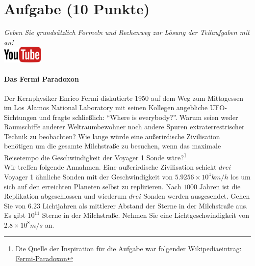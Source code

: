 \documentclass[a4paper, 9pt]{scrartcl}\usepackage[]{graphicx}\usepackage[]{xcolor}
\begin{document}
 
\clearpage

\section{Aufgabe \hfill (10 Punkte)}

\textit{Geben Sie grunds{\"a}tzlich Formeln und Rechenweg zur L{\"o}sung der
  Teilaufgaben mit an!} \\[1Ex]

\hfill\href{https://youtu.be/iCQogS6KhPM}{\includegraphics[width =
  2cm]{img/youtube}} %
\hspace{2Ex}

\paragraph{Das Fermi Paradoxon}



Der Kernphysiker Enrico Fermi diskutierte 1950 auf dem Weg zum Mittagessen
im Los Alamos National Laboratory mit seinen Kollegen angebliche
UFO-Sichtungen und fragte schlie{\ss}lich: "`Where is everybody?"'. Warum seien
weder Raumschiffe anderer Weltraumbewohner noch andere Spuren
extraterrestrischer Technik zu beobachten? Wie lange w{\"u}rde eine au{\ss}erirdische
Zivilisation ben{\"o}tigen um die gesamte Milchstra{\ss}e zu
besuchen, wenn das maximale Reisetempo die Geschwindigkeit der Voyager 1 Sonde w{\"a}re?\footnote{Die Quelle der Inspiration
  für die Aufgabe war folgender Wikipediaeintrag:
  \href{https://de.wikipedia.org/wiki/Fermi-Paradoxon}{Fermi-Paradoxon}}\\[-1ex]

Wir treffen folgende Annahmen. Eine au{\ss}erirdische Zivilisation schickt $drei$
Voyager 1 {\"a}hnliche Sonden mit der Geschwindigkeit von $\ensuremath{5.9256\times 10^{4}}km/h$
los um sich auf den erreichten Planeten selbst zu replizieren. Nach
$1000$ Jahren ist die Replikation abgeschlossen und wiederum
$drei$ Sonden werden ausgesendet. Gehen Sie von
$6.23$ Lichtjahren als mittlerer Abstand der Sterne in der
Milchstra{\ss}e aus. Es gibt $\ensuremath{10^{11}}$ Sterne in der Milchstra{\ss}e. Nehmen
Sie eine Lichtgeschwindigkeit von $\ensuremath{2.8\times 10^{8}}m/s$ an.
\end{document}
